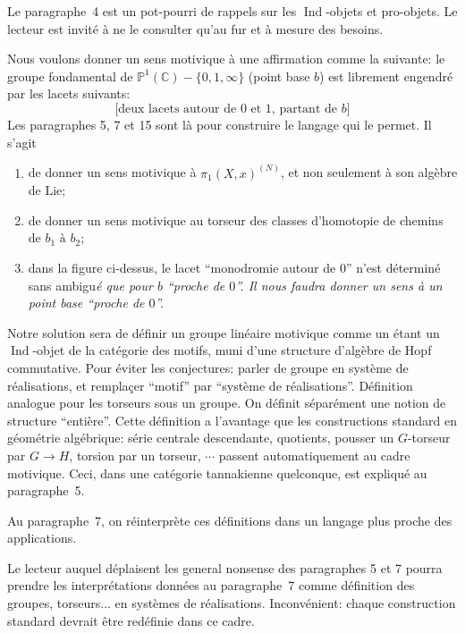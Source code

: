 \documentclass[12pt,a4paper]{article}
\theoremstyle{plain}
\theoremstyle{definition}
\theoremstyle{remark}
\DeclareMathOperator{\Ind}{Ind}
\begin{document}
Le paragraphe~4 est un pot-pourri de rappels sur les $\Ind$-objets et pro-objets. Le
lecteur est invit\'e \`a ne le consulter qu'au fur et \`a mesure des besoins.

Nous voulons donner un sens motivique \`a une affirmation comme la suivante: le groupe
fondamental de $\mathbb{P}^1(\mathbb{C}) - \{0, 1, \infty\}$ (point base $b$) est librement
engendr\'e par les lacets suivants:
\begin{equation}\label{intro-lacets}
\text{[deux lacets autour de $0$ et $1$, partant de $b$]}
\end{equation}
Les paragraphes 5, 7 et 15 sont l\`a pour construire le langage qui le permet. Il s'agit
\begin{enumerate}[label=(\alph*)]
\item de donner un sens motivique \`a $\pi_1(X,x)^{(N)}$, et non seulement \`a son
alg\`ebre de Lie;
\item de donner un sens motivique au torseur des classes d'homotopie de chemins de
$b_1$ \`a $b_2$;
\item dans la figure ci-dessus, le lacet ``monodromie autour de $0$'' n'est d\'etermin\'e
sans ambigu\it\'e que pour $b$ ``proche de $0$''. Il nous faudra donner un sens \`a un point base
``proche de $0$''.
\end{enumerate}

Notre solution sera de d\'efinir un groupe lin\'eaire motivique comme un
\'etant un $\Ind$-objet de la cat\'egorie des motifs, muni d'une structure d'alg\`ebre
de Hopf commutative. Pour \'eviter les conjectures: parler de groupe en syst\`eme de
r\'ealisations, et rempla\c{c}er ``motif'' par ``syst\`eme de r\'ealisations''.
D\'efinition analogue pour les torseurs sous un groupe. On d\'efinit s\'epar\'ement une
notion de structure ``enti\`ere''. Cette d\'efinition a l'avantage que les constructions
standard en g\'eom\'etrie alg\'ebrique: s\'erie centrale descendante, quotients, pousser un
$G$-torseur par $G \to H$, torsion par un torseur, $\cdots$ passent automatiquement au
cadre motivique. Ceci, dans une cat\'egorie tannakienne quelconque, est expliqu\'e au
paragraphe~5.

Au paragraphe~7, on r\'einterpr\`ete ces d\'efinitions dans un langage plus proche des
applications.

Le lecteur auquel d\'eplaisent les general nonsense des paragraphes 5 et 7 pourra prendre
les interpr\'etations donn\'ees au paragraphe~7 comme d\'efinition des groupes, torseurs$\ldots$
en syst\`emes de r\'ealisations. Inconv\'enient: chaque construction standard devrait \^etre
red\'efinie dans ce cadre.
\end{document}
